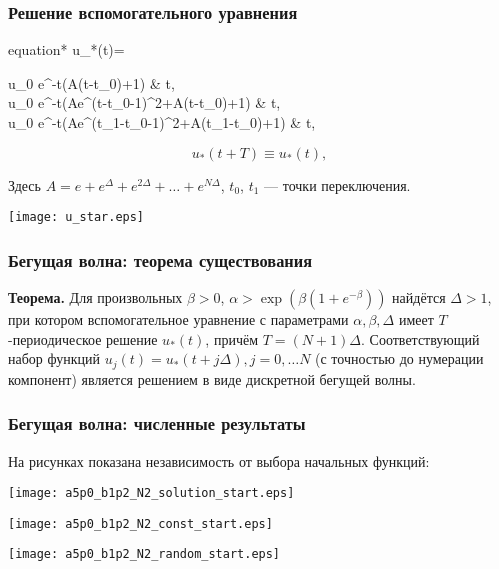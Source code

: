 \begin{frame}
	\frametitle{Решение вспомогательного уравнения}
	\footnotesize
	\begin{empheq}[box=\myeq]{equation*}
		u_*(t)=
		\begin{cases}
			u_0 e^{-\beta t}(\alpha A(t-t_0)+1) &  t\in[t_0,t_0+1],
			\\
			u_0 e^{-\beta t}\left(Ae^{\beta}(t-t_0-1)^2+\alpha A(t-t_0)+1\right) &  t\in[t_0+1,t_1],
			\\
			u_0 e^{-\beta t}\left(Ae^{\beta}(t_1-t_0-1)^2+\alpha A(t_1-t_0)+1\right) &  t\in[t_1,t_0+T],
		\end{cases}
	\end{empheq}
	\normalsize
	\[
	u_*(t+T)\equiv u_*(t),
	\]
	
	Здесь $A = e + e^{\Delta} + e^{2\Delta} + \ldots + e^{N\Delta}$, $t_0$, $t_1$ --- точки переключения.
	
	\begin{center}
		\texttt{[image: u\_star.eps]}
	\end{center}
\end{frame}

\begin{frame}
	\frametitle{Бегущая волна: теорема существования}
	
	\textbf{Теорема.} 
	Для произвольных $\beta > 0$, $\alpha > \exp\left(\beta(1 + e^{-\beta})\right)$ найдётся $\Delta > 1$, при котором вспомогательное уравнение с параметрами $\alpha, \beta, \Delta$ имеет $T$-периодическое решение $u_*(t)$, причём $T = (N + 1) \Delta$. Соответствующий набор функций $u_j(t) = u_*(t + j \Delta), j = 0, \ldots N$ (с точностью до нумерации компонент) является решением в виде дискретной бегущей волны.
\end{frame}

\begin{frame}
	\frametitle{Бегущая волна: численные результаты}
	
	На рисунках показана независимость от выбора начальных функций:
	
	\begin{center}
		\texttt{[image: a5p0\_b1p2\_N2\_solution\_start.eps]}
		
		\texttt{[image: a5p0\_b1p2\_N2\_const\_start.eps]}
		
		\texttt{[image: a5p0\_b1p2\_N2\_random\_start.eps]}
	\end{center}
\end{frame}

